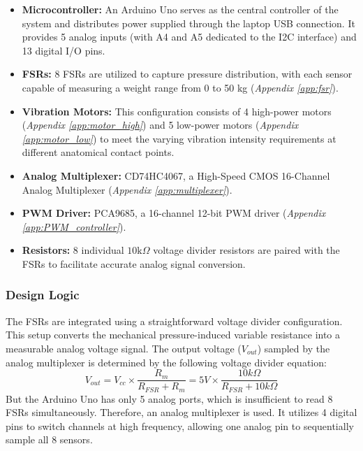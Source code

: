 \documentclass[11pt, a4paper]{article}
\begin{document}
\begin{itemize}
    \item \textbf{Microcontroller:} An Arduino Uno serves as the central controller of the system and distributes power supplied through the laptop USB connection. It provides 5 analog inputs (with A4 and A5 dedicated to the I2C interface) and 13 digital I/O pins.
    
    \item \textbf{FSRs:} 8 FSRs are utilized to capture pressure distribution, with each sensor capable of measuring a weight range from 0 to 50 kg (\textit{Appendix \ref{app:fsr}}).
    
    \item \textbf{Vibration Motors:} This configuration consists of 4 high-power motors (\textit{Appendix \ref{app:motor_high}}) and 5 low-power motors (\textit{Appendix \ref{app:motor_low}}) to meet the varying vibration intensity requirements at different anatomical contact points.
    
    \item \textbf{Analog Multiplexer:} CD74HC4067, a High-Speed CMOS 16-Channel Analog Multiplexer (\textit{Appendix \ref{app:multiplexer}}).
    
    \item \textbf{PWM Driver:} PCA9685, a 16-channel 12-bit PWM driver (\textit{Appendix \ref{app:PWM_controller}}).
    
    \item \textbf{Resistors:} 8 individual $10\text{k}\Omega$ voltage divider resistors are paired with the FSRs to facilitate accurate analog signal conversion.

    \end{itemize}
    
\subsubsection{Design Logic}
The FSRs are integrated using a straightforward voltage divider configuration. This setup converts the mechanical pressure-induced variable resistance into a measurable analog voltage signal. The output voltage ($V_{out}$) sampled by the analog multiplexer is determined by the following voltage divider equation:
\begin{equation}
    V_{out} = V_{cc} \times \frac{R_m}{R_{FSR} + R_m} = 5V \times \frac{10k\Omega}{R_{FSR} + 10k\Omega}
    \label{eq:voltage_divider}
\end{equation}
But the Arduino Uno has only 5 analog ports, which is insufficient to read 8 FSRs simultaneously. 
Therefore, an analog multiplexer is used. It utilizes 4 digital pins to switch channels at high frequency, allowing one analog pin to sequentially sample all 8 sensors.
\end{document}
